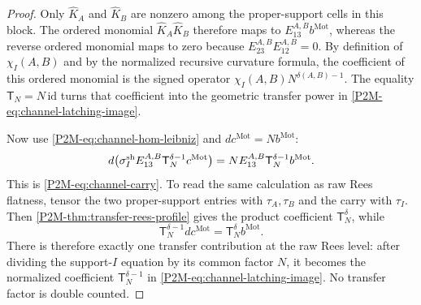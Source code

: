 \documentclass[11pt]{article}
\theoremstyle{remark}
\newcommand{\Mot}{\mathrm{Mot}}
\begin{document}
\begin{proof}
Only $\widehat K_A$ and $\widehat K_B$ are nonzero among the proper-support
cells in this block.  The ordered monomial
$\widehat K_A\widehat K_B$ therefore maps to
$E_{13}^{A,B}b^{\Mot}$, whereas the reverse ordered monomial maps to zero
because $E_{23}^{A,B}E_{12}^{A,B}=0$.  By definition of
$\chi_I(A,B)$ and by the normalized recursive curvature formula, the
coefficient of this ordered monomial is the signed operator
$\chi_I(A,B)N^{\delta(A,B)-1}$.  The equality
$\mathsf T_N=N\,\mathrm{id}$ turns that coefficient into the geometric
transfer power in \eqref{P2M-eq:channel-latching-image}.

Now use \eqref{P2M-eq:channel-hom-leibniz} and
$dc^{\Mot}=Nb^{\Mot}$:
\[
 d\bigl(
   \sigma_I^{\rm sh}E_{13}^{A,B}
   \mathsf T_N^{\delta-1}c^{\Mot}
  \bigr)
 =N E_{13}^{A,B}\mathsf T_N^{\delta-1}b^{\Mot}.
\]
This is \eqref{P2M-eq:channel-carry}.  To read the same calculation as raw
Rees flatness, tensor the two proper-support entries with
$\tau_A,\tau_B$ and the carry with $\tau_I$.  Then
\cref{P2M-thm:transfer-rees-profile} gives the product coefficient
$\mathsf T_N^{\delta}$, while
\[
 \mathsf T_N^{\delta-1}dc^{\Mot}
 =\mathsf T_N^{\delta}b^{\Mot}.
\]
There is therefore exactly one transfer contribution at the raw Rees level:
after dividing the support-$I$ equation by its common factor $N$, it becomes
the normalized coefficient $\mathsf T_N^{\delta-1}$ in
\eqref{P2M-eq:channel-latching-image}.  No transfer factor is double counted.
\end{proof}
\end{document}

